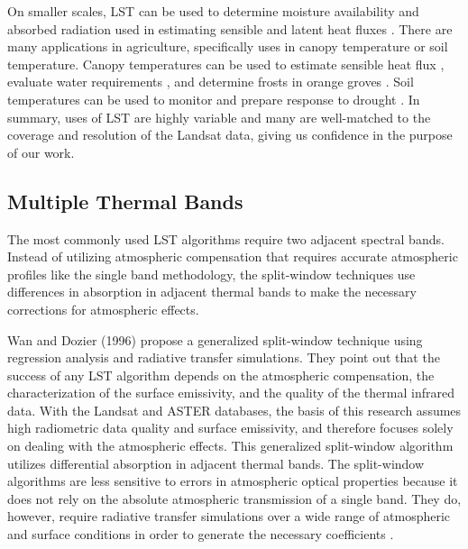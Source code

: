 \documentclass{book}
\begin{document}
On smaller scales, LST can be used to determine moisture availability and absorbed radiation used in estimating sensible and latent heat fluxes \cite{kimuru_1994}.  There are many applications in agriculture, specifically uses in canopy temperature or soil temperature.  Canopy temperatures can be used to estimate sensible heat flux \cite{vinning_1992}, evaluate water requirements \cite{jackson_1977}, and determine frosts in orange groves \cite{caselles_1989}.  Soil temperatures can be used to monitor and prepare response to drought \cite{feldhake_1996}.  In summary, uses of LST are highly variable and many are well-matched to the coverage and resolution of the Landsat data, giving us confidence in the purpose of our work.

\subsection{Multiple Thermal Bands}
\label{sec:multiplethermalbands}

The most commonly used LST algorithms require two adjacent spectral bands.  Instead of utilizing atmospheric compensation that requires accurate atmospheric profiles like the single band methodology, the split-window techniques use differences in absorption in adjacent thermal bands to make the necessary corrections for atmospheric effects.

Wan and Dozier (1996) propose a generalized split-window technique using regression analysis and radiative transfer simulations.  They point out that the success of any LST algorithm depends on the atmospheric compensation, the characterization of the surface emissivity, and the quality of the thermal infrared data.  With the Landsat and ASTER databases, the basis of this research assumes high radiometric data quality and surface emissivity, and therefore focuses solely on dealing with the atmospheric effects.  This generalized split-window algorithm utilizes differential absorption in adjacent thermal bands.  The split-window algorithms are less sensitive to errors in atmospheric optical properties because it does not rely on the absolute atmospheric transmission of a single band.  They do, however, require radiative transfer simulations over a wide range of atmospheric and surface conditions in order to generate the necessary coefficients \cite{wan_1996}.
\end{document}
